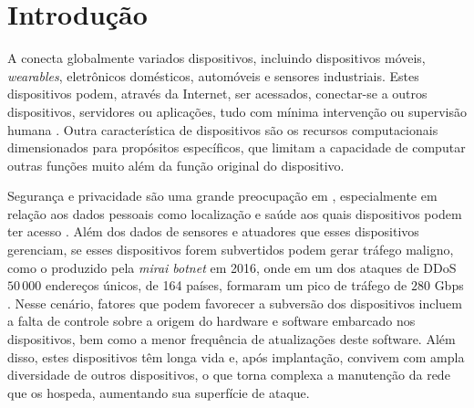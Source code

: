 
\chapter{Introdução}\label{cha:intro}

A \iot conecta globalmente variados dispositivos, incluindo dispositivos móveis,
\emph{wearables}, eletrônicos domésticos, automóveis e sensores industriais.
Estes dispositivos podem, através da Internet, ser acessados, conectar-se a
outros dispositivos, servidores ou aplicações, tudo com mínima intervenção ou
supervisão humana
\cite{Tahsien2020,abane2019,haddadpajouh2019survey,Shanbhag2015}.
Outra característica de dispositivos \iot são os recursos computacionais
dimensionados para propósitos específicos, que limitam a capacidade de computar
outras funções muito além da função original do dispositivo.


Segurança e privacidade são uma grande preocupação em \iot, especialmente em
relação aos dados pessoais como localização e saúde aos quais dispositivos podem ter
acesso \cite{sengupta2020comprehensive}.
Além dos dados de sensores e atuadores que esses dispositivos gerenciam, se
esses dispositivos forem subvertidos podem gerar tráfego maligno, como o
produzido pela \emph{mirai botnet} em 2016, onde em um dos ataques de \acf{DDoS}
$50\,000$ endereços únicos, de 164 países, formaram um pico de tráfego de $280$ Gbps
\cite{Kambourakis2017,Kolias2017mirai}.
Nesse cenário, fatores que podem favorecer a subversão dos dispositivos incluem
a falta de controle sobre a origem do hardware e software embarcado nos
dispositivos, bem como a menor frequência de atualizações deste software.
Além disso, estes dispositivos têm longa vida e, após implantação, convivem com
ampla diversidade de outros dispositivos, o que torna complexa a manutenção da rede
que os hospeda, aumentando sua superfície de ataque.

